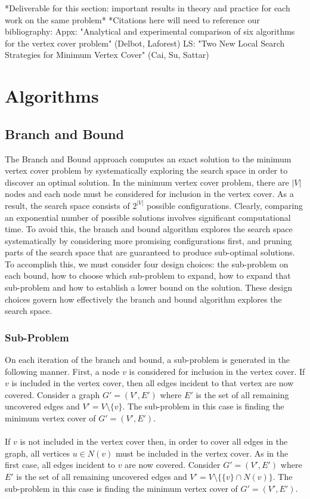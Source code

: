 \documentclass{sig-alternate-05-2015}
\begin{document}
*Deliverable for this section: important results in theory and practice for each work on the same problem*
*Citations here will need to reference our bibliography:
Appx: "Analytical and experimental comparison of six algorithms for the vertex cover problem" (Delbot, Laforest)
LS: "Two New Local Search Strategies for Minimum Vertex Cover" (Cai, Su, Sattar)

\section{Algorithms}
\subsection{Branch and Bound}
The Branch and Bound approach computes an exact solution to the minimum vertex cover problem by systematically exploring the search space in order to discover an optimal solution. In the minimum vertex cover problem, there are $|V|$ nodes and each node must be considered for inclusion in the vertex cover. As a result, the search space consists of $2^{|V|}$ possible configurations. Clearly, comparing an exponential number of possible solutions involves significant computational time. To avoid this, the branch and bound algorithm explores the search space systematically by considering more promising configurations first, and pruning parts of the search space that are guaranteed to produce sub-optimal solutions. To accomplish this, we must consider four design choices: the sub-problem on each bound, how to choose which sub-problem to expand, how to expand that sub-problem and how to establish a lower bound on the solution. These design choices govern how effectively the branch and bound algorithm explores the search space.
\subsubsection{Sub-Problem}
On each iteration of the branch and bound, a sub-problem is generated in the following manner. First, a node $v$ is considered for inclusion in the vertex cover. If $v$ is included in the vertex cover, then all edges incident to that vertex are now covered. Consider a graph $G'=(V',E')$ where $E'$ is the set of all remaining uncovered edges and $V' = V \setminus \lbrace v \rbrace $. The sub-problem in this case is finding the minimum vertex cover of $G' = (V',E')$.
\\
\\
If $v$ is not included in the vertex cover then, in order to cover all edges in the graph, all vertices $u \in N(v)$ must be included in the vertex cover. As in the first case, all edges incident to $v$ are now covered. Consider $G'=(V',E')$  where $E'$ is the set of all remaining uncovered edges and $V' = V \setminus \lbrace \lbrace v \rbrace \cap N(v) \rbrace $. The sub-problem in this case is finding the minimum vertex cover of $G' = (V',E')$. 
\end{document}
